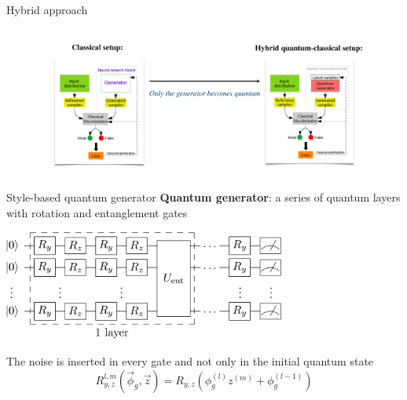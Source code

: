 \documentclass[11pt,aspectratio=169]{beamer}
\begin{document}
\begin{frame}{Hybrid approach }
    \begin{figure}
        \includegraphics[width=1\textwidth]{figures/qGAN.png}
    \end{figure}
\end{frame}

\begin{frame}{Style-based quantum generator}
    \textbf{Quantum generator}: a series of quantum layers with rotation and entanglement gates
    \vspace{0.5cm}

        \centering
            \includegraphics[width=0.7\textwidth]{figures/ansatz.png}
            
            
    \begin{tcolorbox}[title=Style-based approach]
        The noise is inserted in every gate and not only in the initial quantum state
        \[ R_{y,z}^{l,m}(\vec{\phi}_g, \vec{z}) = R_{y,z}(\phi_g^{(l)} z^{(m)} + \phi_g^{(l-1)}) \]
        
    \end{tcolorbox}
\end{frame}
\end{document}
